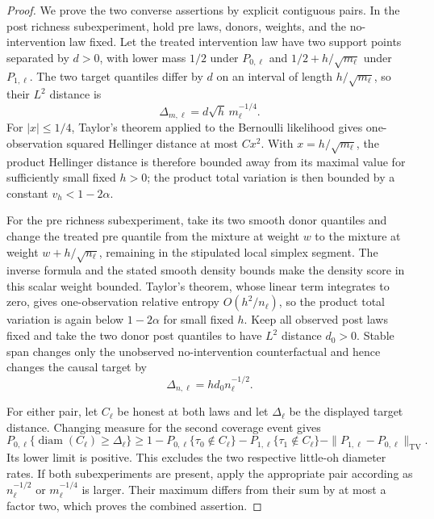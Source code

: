 \documentclass{article}
\begin{document}
\begin{proof}
We prove the two converse assertions by explicit contiguous pairs.  In the post richness subexperiment, hold pre laws, donors, weights, and the no-intervention law fixed.  Let the treated intervention law have two support points separated by \(d>0\), with lower mass \(1/2\) under \(P_{0,\ell}\) and \(1/2+h/\sqrt{m_\ell}\) under \(P_{1,\ell}\).  The two target quantiles differ by \(d\) on an interval of length \(h/\sqrt{m_\ell}\), so their \(L^2\) distance is
\[
 \Delta_{m,\ell}=d\sqrt h\,m_\ell^{-1/4}.
\]
For \(|x|\leq1/4\), Taylor's theorem applied to the Bernoulli likelihood gives one-observation squared Hellinger distance at most \(C x^2\).  With \(x=h/\sqrt{m_\ell}\), the product Hellinger distance is therefore bounded away from its maximal value for sufficiently small fixed \(h>0\); the product total variation is then bounded by a constant \(v_h<1-2\alpha\).

For the pre richness subexperiment, take its two smooth donor quantiles and change the treated pre quantile from the mixture at weight \(w\) to the mixture at weight \(w+h/\sqrt{n_\ell}\), remaining in the stipulated local simplex segment.  The inverse formula and the stated smooth density bounds make the density score in this scalar weight bounded.  Taylor's theorem, whose linear term integrates to zero, gives one-observation relative entropy \(O(h^2/n_\ell)\), so the product total variation is again below \(1-2\alpha\) for small fixed \(h\).  Keep all observed post laws fixed and take the two donor post quantiles to have \(L^2\) distance \(d_0>0\).  Stable span changes only the unobserved no-intervention counterfactual and hence changes the causal target by
\[
 \Delta_{n,\ell}=h d_0n_\ell^{-1/2}.
\]

For either pair, let \(C_\ell\) be honest at both laws and let \(\Delta_\ell\) be the displayed target distance.  Changing measure for the second coverage event gives
\[
 P_{0,\ell}\{\operatorname{diam}(C_\ell)\geq\Delta_\ell\}
 \geq1-P_{0,\ell}\{\tau_0\notin C_\ell\}
       -P_{1,\ell}\{\tau_1\notin C_\ell\}
       -\|P_{1,\ell}-P_{0,\ell}\|_{\mathrm{TV}}.
\]
Its lower limit is positive.  This excludes the two respective little-oh diameter rates.  If both subexperiments are present, apply the appropriate pair according as \(n_\ell^{-1/2}\) or \(m_\ell^{-1/4}\) is larger.  Their maximum differs from their sum by at most a factor two, which proves the combined assertion.
\end{proof}
\end{document}
